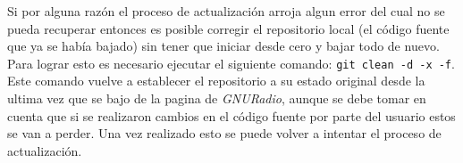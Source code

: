 Si por alguna raz\'on el proceso de actualizaci\'on arroja algun error del cual no se pueda recuperar entonces es posible corregir
el repositorio local (el c\'odigo fuente que ya se hab\'ia bajado) sin tener que iniciar desde cero y bajar todo de nuevo. Para
lograr esto es necesario ejecutar el siguiente comando: \verb|git clean -d -x -f|. Este comando vuelve a establecer el repositorio a su
estado original desde la ultima vez que se bajo de la pagina de \emph{GNURadio}, aunque se debe tomar en cuenta que si se
realizaron cambios en el c\'odigo fuente por parte del usuario estos se van a perder. Una vez realizado esto se puede volver a
intentar el proceso de actualizaci\'on.
